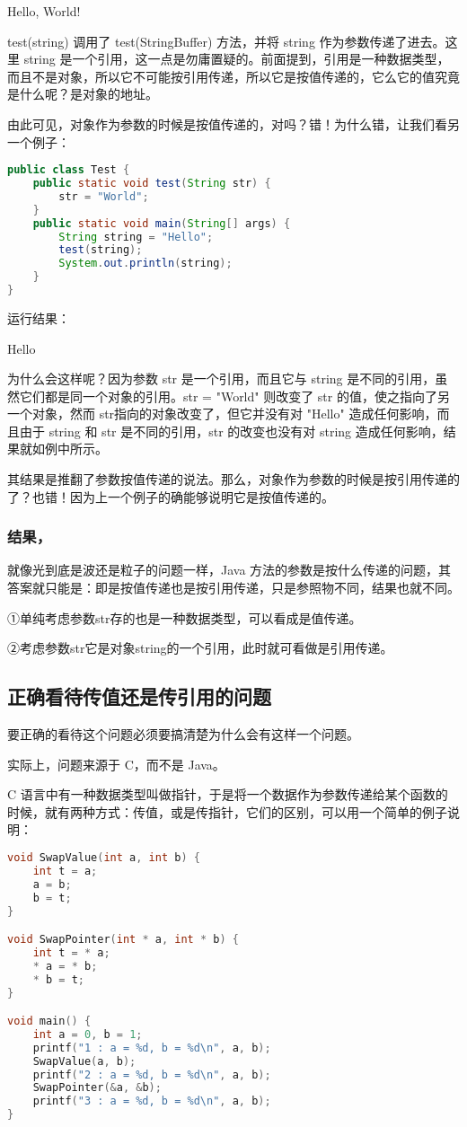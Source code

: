 \documentclass[10pt,b5paper]{article}
\begin{document}
Hello, World!

test(string) 调用了 test(StringBuffer) 方法，并将 string 作为参数传递了进去。这里 string 是一个引用，这一点是勿庸置疑的。前面提到，引用是一种数据类型，而且不是对象，所以它不可能按引用传递，所以它是按值传递的，它么它的值究竟是什么呢？是对象的地址。

由此可见，对象作为参数的时候是按值传递的，对吗？错！为什么错，让我们看另一个例子：
\begin{lstlisting}[language=java]
public class Test { 
    public static void test(String str) { 
        str = "World"; 
    } 
    public static void main(String[] args) { 
        String string = "Hello"; 
        test(string); 
        System.out.println(string); 
    } 
} 
\end{lstlisting}
运行结果： 

Hello

为什么会这样呢？因为参数 str 是一个引用，而且它与 string 是不同的引用，虽然它们都是同一个对象的引用。str = "World" 则改变了 str 的值，使之指向了另一个对象，然而 str指向的对象改变了，但它并没有对 "Hello" 造成任何影响，而且由于 string 和 str 是不同的引用，str 的改变也没有对 string 造成任何影响，结果就如例中所示。

其结果是推翻了参数按值传递的说法。那么，对象作为参数的时候是按引用传递的了？也错！因为上一个例子的确能够说明它是按值传递的。

\subsubsection{结果，}
\label{sec-1-3-1}
就像光到底是波还是粒子的问题一样，Java 方法的参数是按什么传递的问题，其答案就只能是：即是按值传递也是按引用传递，只是参照物不同，结果也就不同。

①单纯考虑参数str存的也是一种数据类型，可以看成是值传递。

②考虑参数str它是对象string的一个引用，此时就可看做是引用传递。
\subsection{正确看待传值还是传引用的问题}
\label{sec-1-4}

要正确的看待这个问题必须要搞清楚为什么会有这样一个问题。

实际上，问题来源于 C，而不是 Java。

C 语言中有一种数据类型叫做指针，于是将一个数据作为参数传递给某个函数的时候，就有两种方式：传值，或是传指针，它们的区别，可以用一个简单的例子说明：
\begin{lstlisting}[language=c++]
void SwapValue(int a, int b) { 
    int t = a; 
    a = b; 
    b = t; 
}

void SwapPointer(int * a, int * b) { 
    int t = * a; 
    * a = * b; 
    * b = t; 
}

void main() { 
    int a = 0, b = 1; 
    printf("1 : a = %d, b = %d\n", a, b); 
    SwapValue(a, b); 
    printf("2 : a = %d, b = %d\n", a, b); 
    SwapPointer(&a, &b); 
    printf("3 : a = %d, b = %d\n", a, b); 
} 
\end{lstlisting}
\end{document}
